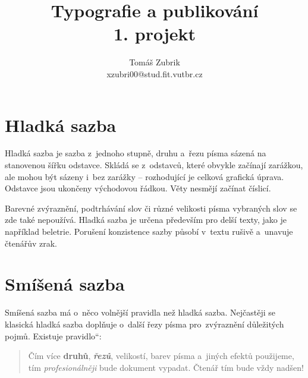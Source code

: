 \documentclass[11pt, a4paper, twocolumn ]{article}
\title{Typografie a publikování \\1. projekt}
\author{Tomáš Zubrik \\xzubri00@stud.fit.vutbr.cz}
\date{}
\newcommand{\myuv}[1]{\quotedblbase #1\textquotedblleft}
\begin{document}
\maketitle

\section{Hladká sazba}
Hladká sazba je sazba z~jednoho stupně, druhu a~řezu pí­sma sázená na stanovenou šířku odstavce. Skládá se z~odstavců, které obvykle začínají zarážkou, ale mohou být sázeny i~bez zarážky -- rozhodující je celková grafická úprava. Odstavce jsou ukončeny východovou řádkou. Věty nesmějí začínat číslicí.

Barevné zvýraznění, podtrhávání slov či různé velikosti písma vybraných slov se zde také nepoužívá. Hladká sazba je určena především pro delší texty, jako je například beletrie. Porušení konzistence sazby působí v~textu rušivě a~unavuje čtenářův zrak.

\section{Smíšená sazba }
Smíšená sazba má o~něco volnější pravidla než hladká sazba. Nejčastěji se klasická hladká sazba doplňuje o~další řezy písma pro~zvýraznění důležitých pojmů. Existuje \myuv{pravidlo}:

\begin{quotation}
Čím více {\textbf{druhů}}, {\textbf{\textit{řezů}}}, {\scriptsize{velikostí}}, barev pís\-ma a~jiných efektů použijeme, tím{\textit{ profesionálněji}} bude  dokument vypadat. Čtenář tím bude vždy {\Huge{nadšen!}}
\end{quotation}
\end{document}
